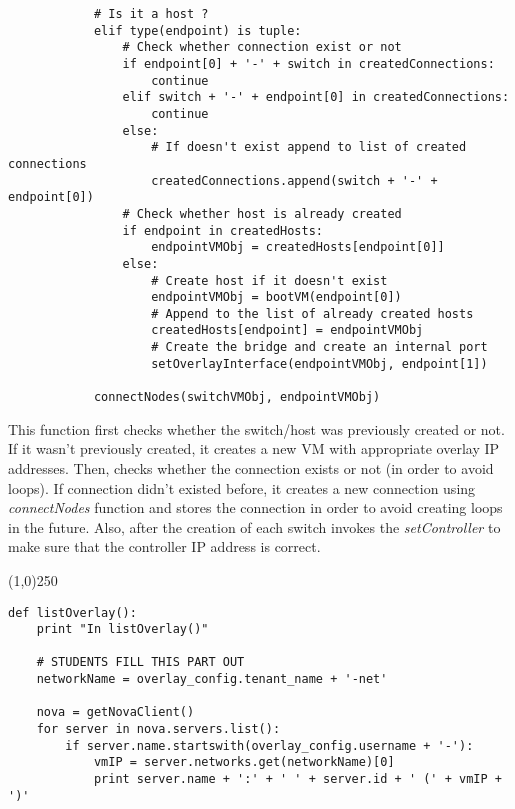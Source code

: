 \documentclass[12pt]{article}
\begin{document}
\begin{verbatim}
            # Is it a host ?
            elif type(endpoint) is tuple:
                # Check whether connection exist or not
                if endpoint[0] + '-' + switch in createdConnections:
                    continue
                elif switch + '-' + endpoint[0] in createdConnections:
                    continue
                else:
                    # If doesn't exist append to list of created connections
                    createdConnections.append(switch + '-' + endpoint[0])
                # Check whether host is already created
                if endpoint in createdHosts:
                    endpointVMObj = createdHosts[endpoint[0]]
                else:
                    # Create host if it doesn't exist
                    endpointVMObj = bootVM(endpoint[0])
                    # Append to the list of already created hosts
                    createdHosts[endpoint] = endpointVMObj
                    # Create the bridge and create an internal port
                    setOverlayInterface(endpointVMObj, endpoint[1])

            connectNodes(switchVMObj, endpointVMObj)
\end{verbatim}

This function first checks whether the switch/host was previously created or not. If it wasn't previously created, it creates a new VM with appropriate overlay IP addresses. Then, checks whether the connection exists or not (in order to avoid loops). If connection didn't existed before, it creates a new connection using \textit{connectNodes} function and stores the connection in order to avoid creating loops in the future. Also, after the creation of each switch invokes the \textit{setController} to make sure that the controller IP address is correct.

\begin{center}
	\line(1,0){250}
\end{center}

\begin{verbatim}
def listOverlay():
    print "In listOverlay()"

    # STUDENTS FILL THIS PART OUT
    networkName = overlay_config.tenant_name + '-net'

    nova = getNovaClient()
    for server in nova.servers.list():
        if server.name.startswith(overlay_config.username + '-'):
            vmIP = server.networks.get(networkName)[0]
            print server.name + ':' + ' ' + server.id + ' (' + vmIP + ')'
\end{verbatim}
\end{document}
